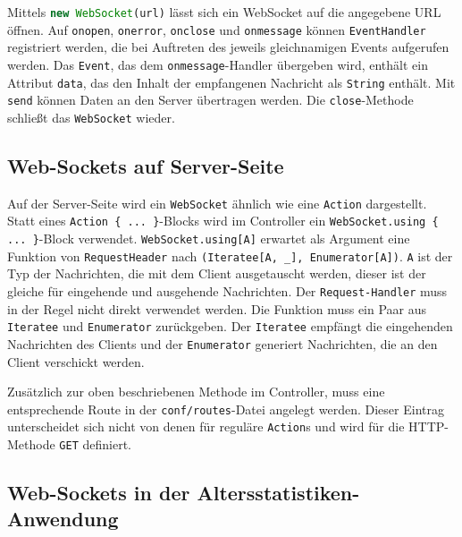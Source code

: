 Mittels \lstinline[language=javascript]|new WebSocket(url)| lässt sich ein WebSocket auf die angegebene URL öffnen.
Auf \lstinline|onopen|, \lstinline|onerror|, \lstinline|onclose| und \lstinline|onmessage| können \lstinline|EventHandler| registriert werden, die bei Auftreten des jeweils gleichnamigen Events aufgerufen werden.
Das \lstinline|Event|, das dem \lstinline|onmessage|-Handler übergeben wird, enthält ein Attribut \lstinline|data|, das den Inhalt der empfangenen Nachricht als \lstinline|String| enthält.
Mit \lstinline|send| können Daten an den Server übertragen werden.
Die \lstinline|close|-Methode schließt das \lstinline|WebSocket| wieder.


\subsection{Web-Sockets auf Server-Seite} %
\label{sub:web_sockets_auf_server_seite}

Auf der Server-Seite wird ein \lstinline|WebSocket| ähnlich wie eine \lstinline|Action| dargestellt.
Statt eines \lstinline|Action { ... }|-Blocks wird im Controller ein \lstinline|WebSocket.using { ... }|-Block verwendet.
\lstinline|WebSocket.using[A]| erwartet als Argument eine Funktion von \lstinline|RequestHeader| nach \lstinline|(Iteratee[A, _], Enumerator[A])|.
\lstinline|A| ist der Typ der Nachrichten, die mit dem Client ausgetauscht werden, dieser ist der gleiche für eingehende und ausgehende Nachrichten.
Der \lstinline|Request-Handler| muss in der Regel nicht direkt verwendet werden.
Die Funktion muss ein Paar aus \lstinline|Iteratee| und \lstinline|Enumerator| zurückgeben.
Der \lstinline|Iteratee| empfängt die eingehenden Nachrichten des Clients und der \lstinline|Enumerator| generiert Nachrichten, die an den Client verschickt werden.

Zusätzlich zur oben beschriebenen Methode im Controller, muss eine entsprechende Route in der \lstinline|conf/routes|-Datei angelegt werden.
Dieser Eintrag unterscheidet sich nicht von denen für reguläre \lstinline|Action|s und wird für die HTTP-Methode \lstinline|GET| definiert.


\subsection{Web-Sockets in der Altersstatistiken-Anwendung} %
\label{sub:web_sockets_in_der_altersstatistiken_anwendung}

